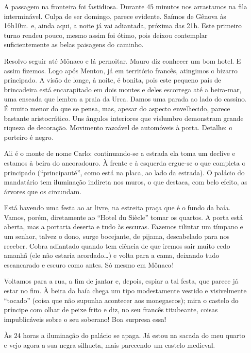 A passagem na fronteira foi fastidiosa. Durante 45 minutos nos arrastamos na fila interminável. Culpa de ser domingo, parece evidente. Saímos de Gênova às 16h10m. e, ainda aqui, a noite já vai adiantada, próxima das 21h. Este primeiro turno rendeu pouco, mesmo assim foi ótimo, pois deixou contemplar suficientemente as belas paisagens do caminho.

Resolvo seguir até Mônaco e lá pernoitar. Mauro diz conhecer um bom hotel. E assim fizemos. Logo após Menton, já em território francês, atingimos o bizarro principado. A visão de longe, à noite, é bonita, pois este pequeno país de brincadeira está encarapitado em dois montes e deles escorrega até a beira-mar, uma enseada que lembra a praia da Urca. Damos uma parada ao lado do cassino. É muito menor do que se pensa, mas, apesar do aspecto envelhecido, parece bastante aristocrático. Uns ângulos interiores que vislumbro demonstram grande riqueza de decoração. Movimento razoável de automóveis à porta. Detalhe: o porteiro é negro.

Ali é o monte de nome Carlo; continuando-se a estrada ela toma um declive e estamos à beira do ancoradouro. À frente e à esquerda ergue-se o que completa o principado (``principauté'', como está na placa, ao lado da estrada). O palácio do mandatário tem iluminação indireta nos muros, o que destaca, com belo efeito, as árvores que os circundam.

Está havendo uma festa ao ar livre, na estreita praça que é o fundo da baía. Vamos, porém, diretamente ao ``Hotel du Siècle'' tomar os quartos. A porta está aberta, mas a portaria deserta e tudo às escuras. Fazemos tilintar um tímpano e um senhor, talvez o dono, surge bocejante, de pijama, descabelado para nos receber. Cobra adiantado quando tem ciência de que iremos sair muito cedo amanhã (ele não estaria acordado\ldots) e volta para a cama, deixando tudo escancarado e escuro como antes. Só mesmo em Mônaco!

Voltamos para a rua, a fim de jantar e, depois, espiar a tal festa, que parece já estar no fim. À beira da baía chega um tipo modestamente vestido e visivelmente ``tocado'' (coisa que não supunha acontecer aos monegascos); mira o castelo do príncipe com olhar de peixe frito e diz, no seu francês titubeante, coisas impublicáveis sobre o seu soberano! Boa surpresa essa!

Às 24 horas a iluminação do palácio se apaga. Já estou na sacada do meu quarto e vejo agora a sua negra silhueta, mais parecendo um castelo medieval.

